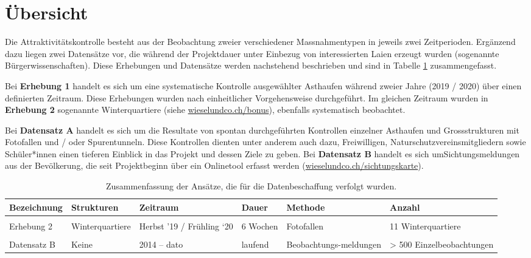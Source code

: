 \documentclass[
  oneside]{scrbook}
\begin{document}
\hypertarget{uxfcbersicht}{%
\section{Übersicht}\label{uxfcbersicht}}

Die Attraktivitätskontrolle besteht aus der Beobachtung zweier verschiedener Massnahmentypen in jeweils zwei Zeitperioden. Ergänzend dazu liegen zwei Datensätze vor, die während der Projektdauer unter Einbezug von interessierten Laien erzeugt wurden (sogenannte Bürgerwissenschaften). Diese Erhebungen und Datensätze werden nachstehend beschrieben und sind in Tabelle \ref{tab:erhebungswochen} zusammengefasst.

Bei \textbf{Erhebung 1} handelt es sich um eine systematische Kontrolle ausgewählter Asthaufen während zweier Jahre (2019 / 2020) über einen definierten Zeitraum. Diese Erhebungen wurden nach einheitlicher Vorgehensweise durchgeführt. Im gleichen Zeitraum wurden in \textbf{Erhebung 2} sogenannte Winterquartiere (siehe \href{http://www.wieselundco.ch/bonus}{wieselundco.ch/bonus}), ebenfalls systematisch beobachtet.

Bei \textbf{Datensatz A} handelt es sich um die Resultate von spontan durchgeführten Kontrollen einzelner Asthaufen und Grossstrukturen mit Fotofallen und / oder Spurentunneln. Diese Kontrollen dienten unter anderem auch dazu, Freiwilligen, Naturschutzvereinsmitgliedern sowie Schüler*innen einen tieferen Einblick in das Projekt und dessen Ziele zu geben. Bei \textbf{Datensatz B} handelt es sich umSichtungsmeldungen aus der Bevölkerung, die seit Projektbeginn über ein Onlinetool erfasst werden (\href{http://www.wieselundco.ch/beobachtung}{wieselundco.ch/sichtungskarte}).

\begin{table}

\caption{\label{tab:erhebungswochen}Zusammenfassung der Ansätze, die für die Datenbeschaffung verfolgt wurden.}
\centering
\begin{tabular}[t]{llp{20mm}lp{22mm}p{40mm}}
\toprule
Bezeichnung & Strukturen & Zeitraum & Dauer & Methode & Anzahl\\
\midrule
\cellcolor{gray!6}{Erhebung 1} & \cellcolor{gray!6}{Asthaufen} & \cellcolor{gray!6}{Herbst ’19 / Frühling ‘20} & \cellcolor{gray!6}{6 Wochen} & \cellcolor{gray!6}{Spurentunnel} & \cellcolor{gray!6}{39 Asthaufen}\\
Erhebung 2 & Winterquartiere & Herbst ’19 / Frühling ‘20 & 6 Wochen & Fotofallen & 11 Winterquartiere\\
\cellcolor{gray!6}{Datensatz A} & \cellcolor{gray!6}{Asthaufen} & \cellcolor{gray!6}{2014 - 2019} & \cellcolor{gray!6}{Variabel} & \cellcolor{gray!6}{Spurentunnel / Fotofallen} & \cellcolor{gray!6}{32 Asthaufen}\\
Datensatz B & Keine & 2014 – dato & laufend & Beobachtungs-meldungen & > 500 Einzelbeobachtungen\\
\bottomrule
\end{tabular}
\end{table}
\end{document}
